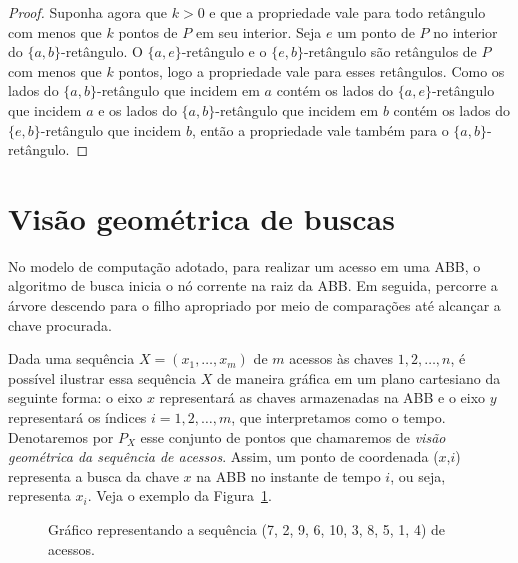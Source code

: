 \begin{proof}
    Suponha agora que $k > 0$ e que a propriedade vale para todo retângulo com menos que $k$ pontos de $P$ em seu interior. Seja $e$ um ponto de $P$ no interior do $\{a,b\}$-retângulo. O $\{a,e\}$-retângulo e o $\{e,b\}$-retângulo são retângulos de $P$ com menos que $k$ pontos, logo a propriedade vale para esses retângulos. Como os lados do $\{a,b\}$-retângulo que incidem em $a$ contém os lados do $\{a,e\}$-retângulo que incidem $a$ e os lados do $\{a,b\}$-retângulo que incidem em $b$ contém os lados do $\{e,b\}$-retângulo que incidem $b$, então a propriedade vale também para o $\{a,b\}$-retângulo.
\end{proof}

\section{Visão geométrica de buscas}

No modelo de computação adotado, para realizar um acesso em uma ABB, o algoritmo de busca inicia o nó corrente na raiz da ABB. Em seguida, percorre a árvore descendo para o filho apropriado por meio de comparações até alcançar a chave procurada.

Dada uma sequência $X = (x_{1},\ldots,x_{m})$ de $m$ acessos às chaves $1,2,\ldots,n$, é possível ilustrar essa sequência $X$ de maneira gráfica em um plano cartesiano da seguinte forma: o eixo $x$ representará as chaves armazenadas na ABB e o eixo $y$ representará os índices $i = 1,2,\ldots,m$, que interpretamos como o tempo. Denotaremos por $P_X$ esse conjunto de pontos que chamaremos de \textit{visão geométrica da sequência de acessos}. Assim, um ponto de coordenada ($x$,$i$) representa a busca da chave $x$ na ABB no instante de tempo $i$, ou seja, representa $x_i$. Veja o exemplo da Figura~\ref{fig:busca_padrao}.

\begin{figure}
    \caption{Gráfico representando a sequência (7, 2, 9, 6, 10, 3, 8, 5, 1, 4) de acessos.}
\label{fig:busca_padrao}
\end{figure}


